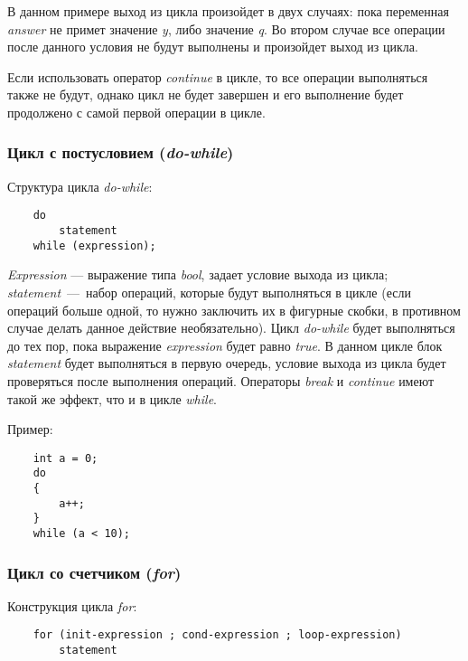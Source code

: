 В данном примере выход из цикла произойдет в двух случаях: пока переменная \textit{answer} не примет значение \textit{y}, либо значение \textit{q}. Во втором случае все операции после данного условия не будут выполнены и произойдет выход из цикла.

Если использовать оператор \textit{continue} в цикле, то все операции выполняться также не будут, однако цикл не будет завершен и его выполнение будет продолжено с самой первой операции в цикле. 

\subsubsection{Цикл с постусловием (\textit{do-while})}
Структура цикла \textit{do-while}:
\begin{lstlisting}
    do
        statement
    while (expression);
\end{lstlisting}

\textit{Expression} --- выражение типа \textit{bool}, задает условие выхода из цикла; \textit{statement}~---~набор операций, которые будут выполняться в цикле (если операций больше одной, то нужно заключить их в фигурные скобки, в противном случае делать данное действие необязательно). Цикл \textit{do-while} будет выполняться до тех пор, пока выражение \textit{expression} будет равно \textit{true}. В данном цикле блок \textit{statement} будет выполняться в первую очередь, условие выхода из цикла будет проверяться после выполнения операций. Операторы \textit{break} и \textit{continue} имеют такой же эффект, что и в цикле \textit{while}.

Пример:
\begin{lstlisting}
    int a = 0;
    do
    {
        a++;
    }
    while (a < 10);
\end{lstlisting}

\subsubsection{Цикл со счетчиком (\textit{for})}
Конструкция цикла \textit{for}:
\begin{lstlisting}
    for (init-expression ; cond-expression ; loop-expression)
        statement
\end{lstlisting}

